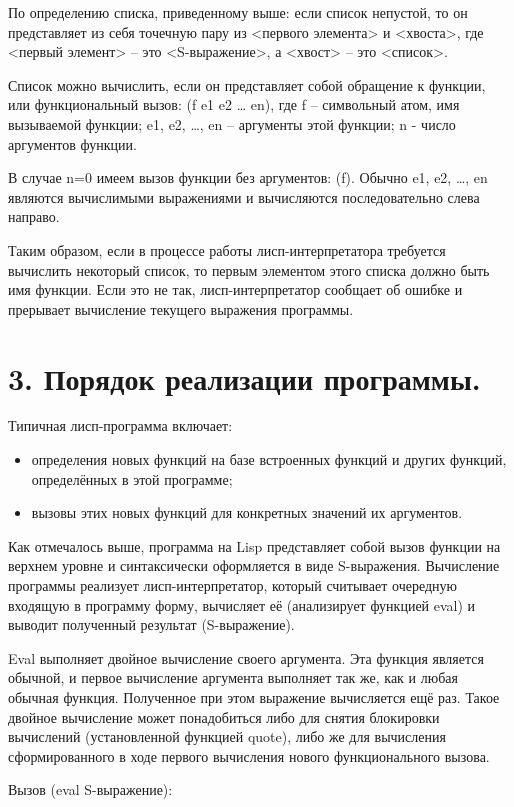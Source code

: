 \documentclass[12pt]{report}
\begin{document}
По определению списка, приведенному выше: если список непустой, то он представляет из себя точечную пару из  <первого элемента> и <хвоста>, где <первый элемент> -- это <S-выражение>, а <хвост> -- это <список>.

Список можно вычислить, если он представляет собой обращение к  функции, или функциональный вызов: (f e1 e2 … en), где f – символьный атом, имя вызываемой функции; e1, e2, …, en – аргументы этой функции; n - число аргументов функции.

В случае n=0 имеем вызов функции без аргументов: (f). Обычно e1, e2, …, en являются вычислимыми выражениями и вычисляются последовательно слева направо.

Таким образом, если в процессе работы лисп-интерпретатора  требуется вычислить некоторый список, то первым элементом этого   списка должно быть имя функции. Если это не так, лисп-интерпретатор  сообщает об ошибке и прерывает вычисление текущего выражения  программы.


\section*{3. Порядок реализации программы.}

Типичная лисп-программа включает:
\begin{itemize}
	\item определения новых функций на базе встроенных функций и других функций, определённых в этой программе;
	\item {вызовы этих новых функций для конкретных значений их аргументов.}
\end{itemize}

Как отмечалось выше, программа на Lisp представляет собой вызов функции на верхнем уровне и синтаксически оформляется в виде S-выражения. Вычисление программы реализует лисп-интерпретатор, который считывает очередную входящую в программу форму, вычисляет её (анализирует функцией eval) и выводит полученный результат (S-выражение).

Eval выполняет двойное  вычисление своего аргумента. Эта функция является обычной, и первое  вычисление аргумента выполняет так же, как и любая обычная функция.  Полученное при этом выражение вычисляется ещё раз. Такое двойное  вычисление может понадобиться либо для снятия блокировки вычислений (установленной функцией quote), либо же для вычисления сформированного в ходе первого вычисления нового функционального вызова.

\clearpage
Вызов (eval S-выражение):
\end{document}
